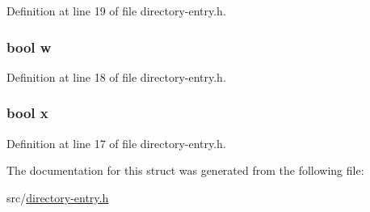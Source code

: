 Definition at line 19 of file directory-\/entry.\-h.

\hypertarget{structpoi__attr__t_ac2e5f3b10af22c39ed83be143a508b80}{
\subsubsection[{w}]{\setlength{\rightskip}{0pt plus 5cm}bool w}}\label{structpoi__attr__t_ac2e5f3b10af22c39ed83be143a508b80}


Definition at line 18 of file directory-\/entry.\-h.

\hypertarget{structpoi__attr__t_a946a8f8377210c472c7cbdf11f154280}{
\subsubsection[{x}]{\setlength{\rightskip}{0pt plus 5cm}bool x}}\label{structpoi__attr__t_a946a8f8377210c472c7cbdf11f154280}


Definition at line 17 of file directory-\/entry.\-h.



The documentation for this struct was generated from the following file\-:\begin{DoxyCompactItemize}
\item 
src/\hyperlink{directory-entry_8h}{directory-\/entry.\-h}\end{DoxyCompactItemize}
